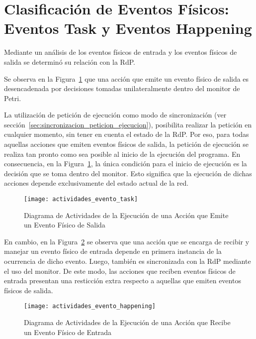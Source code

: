 \section{Clasificación de Eventos Físicos: \\ Eventos Task y Eventos Happening}
\label{sec:clasificacion_eventos_fisicos} 
Mediante un análisis de los eventos físicos de entrada y los eventos
físicos de salida se determinó su relación con la RdP. 

Se observa en la Figura~\ref{fig:actividades_evento_task} que una acción que
emite un evento físico de salida es desencadenada por decisiones tomadas
unilateralmente dentro del monitor de Petri.

La utilización de petición de ejecución como modo de sincronización (ver
sección~\ref{sec:sincronizacion_peticion_ejecucion}), posibilita realizar la
petición en cualquier momento, sin tener en cuenta el estado de la RdP. Por eso,
para todas aquellas acciones que emiten eventos físicos de salida, la petición
de ejecución se realiza tan pronto como sea posible al inicio de la ejecución del
programa. En consecuencia, en la Figura~\ref{fig:actividades_evento_task}, la
única condición para el inicio de ejecución es la decisión que se toma dentro
del monitor. Esto significa que la ejecución de dichas acciones depende
exclusivamente del estado actual de la red.

\begin{figure}[H]
	\centering
	\texttt{[image: actividades\_evento\_task]}
	\caption{Diagrama de Actividades de la Ejecución de una Acción que Emite un
	Evento Físico de Salida}
	\label{fig:actividades_evento_task}
\end{figure}

En cambio, en la Figura~\ref{fig:actividades_evento_happening} se observa que
una acción que se encarga de recibir y manejar un evento físico de entrada
depende en primera instancia de la ocurrencia de dicho evento. Luego, también es
sincronizada con la RdP mediante el uso del monitor. De este modo, las
acciones que reciben eventos físicos de entrada presentan una resticción extra
respecto a aquellas que emiten eventos físicos de salida.



\begin{figure}[H]
	\centering
	\texttt{[image: actividades\_evento\_happening]}
	\caption{Diagrama de Actividades de la Ejecución de una Acción que Recibe un
	Evento Físico de Entrada}
	\label{fig:actividades_evento_happening}
\end{figure}

